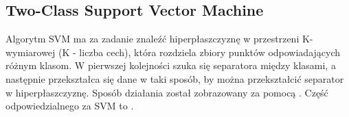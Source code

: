 \subsection{Two-Class Support Vector Machine}
Algorytm SVM ma za zadanie znaleźć hiperpłaszczyznę w przestrzeni K-wymiarowej (K - liczba cech), która rozdziela zbiory punktów odpowiadających różnym klasom. W pierwszej kolejności szuka się separatora między klasami, a następnie przekształca się dane w taki sposób, by można przekształcić separator w hiperpłaszczyznę\cite{IBM}. Sposób działania został zobrazowany za pomocą . Część  odpowiedzialnego za SVM to .

\begin{figure}[H]
    \begin{subfigure}[m]{0.45\textwidth}
        \centering

\end{subfigure}
\end{figure}
